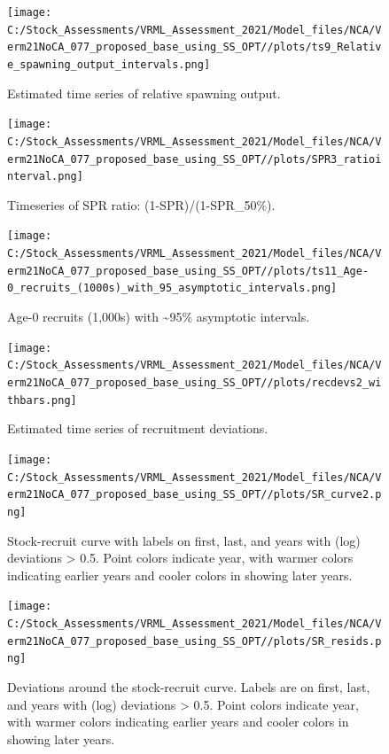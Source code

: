 \documentclass[
  english,
  a4paper,
]{article}
\begin{document}
\FloatBarrier

\FloatBarrier

\begin{figure}
\centering
\texttt{[image: C:/Stock\_Assessments/VRML\_Assessment\_2021/Model\_files/NCA/Verm21NoCA\_077\_proposed\_base\_using\_SS\_OPT//plots/ts9\_Relative\_spawning\_output\_intervals.png]}
\caption{Estimated time series of relative spawning output.\label{fig:depl}}
\end{figure}

\FloatBarrier

\begin{figure}
\centering
\texttt{[image: C:/Stock\_Assessments/VRML\_Assessment\_2021/Model\_files/NCA/Verm21NoCA\_077\_proposed\_base\_using\_SS\_OPT//plots/SPR3\_ratiointerval.png]}
\caption{Timeseries of SPR ratio: (1-SPR)/(1-SPR\_50\%).\label{fig:1-spr}}
\end{figure}

\begin{figure}
\centering
\texttt{[image: C:/Stock\_Assessments/VRML\_Assessment\_2021/Model\_files/NCA/Verm21NoCA\_077\_proposed\_base\_using\_SS\_OPT//plots/ts11\_Age-0\_recruits\_(1000s)\_with\_95\_asymptotic\_intervals.png]}
\caption{Age-0 recruits (1,000s) with \textasciitilde95\% asymptotic intervals.\label{fig:recruits}}
\end{figure}

\begin{figure}
\centering
\texttt{[image: C:/Stock\_Assessments/VRML\_Assessment\_2021/Model\_files/NCA/Verm21NoCA\_077\_proposed\_base\_using\_SS\_OPT//plots/recdevs2\_withbars.png]}
\caption{Estimated time series of recruitment deviations.\label{fig:recdevs}}
\end{figure}

\begin{figure}
\centering
\texttt{[image: C:/Stock\_Assessments/VRML\_Assessment\_2021/Model\_files/NCA/Verm21NoCA\_077\_proposed\_base\_using\_SS\_OPT//plots/SR\_curve2.png]}
\caption{Stock-recruit curve with labels on first, last, and years with (log) deviations \textgreater{} 0.5. Point colors indicate year, with warmer colors indicating earlier years and cooler colors in showing later years.\label{fig:bh-curve}}
\end{figure}

\begin{figure}
\centering
\texttt{[image: C:/Stock\_Assessments/VRML\_Assessment\_2021/Model\_files/NCA/Verm21NoCA\_077\_proposed\_base\_using\_SS\_OPT//plots/SR\_resids.png]}
\caption{Deviations around the stock-recruit curve. Labels are on first, last, and years with (log) deviations \textgreater{} 0.5. Point colors indicate year, with warmer colors indicating earlier years and cooler colors in showing later years.\label{fig:bh-resids}}
\end{figure}
\end{document}
